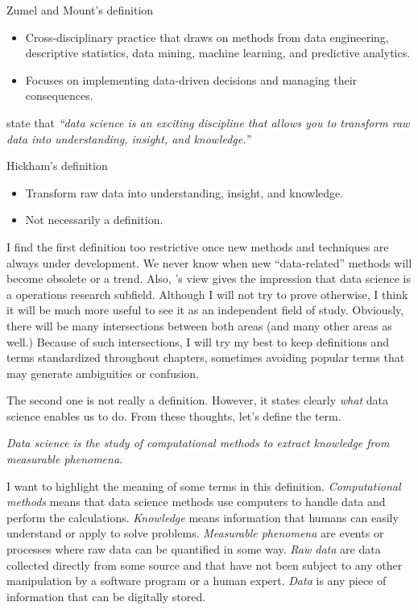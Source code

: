 \begin{mainbox}{Zumel and Mount's definition}
  \begin{itemize}
    \item Cross-disciplinary practice that draws on methods from data
    engineering, descriptive statistics, data mining, machine learning, and predictive
    analytics.
    \item Focuses on implementing data-driven decisions and managing their consequences.
  \end{itemize}
\end{mainbox}

\textcite{Hickham2023} state that \emph{``data science is an exciting discipline that
allows you to transform raw data into understanding, insight, and knowledge.''}

\begin{mainbox}{Hickham's definition}
  \begin{itemize}
    \item Transform raw data into understanding, insight, and knowledge.
    \item Not necessarily a definition.
  \end{itemize}
\end{mainbox}

I find the first definition too restrictive once new methods and techniques are always
under development.  We never know when new ``data-related'' methods will become obsolete
or a trend.  Also, \textcite{Zumel2019}'s view gives the impression that data science is a
operations research subfield.  Although I will not try to prove otherwise, I think it will
be much more useful to see it as an independent field of study.  Obviously, there will be
many intersections between both areas (and many other areas as well.)  Because of such
intersections, I will try my best to keep definitions and
terms standardized throughout chapters, sometimes avoiding popular terms that may generate
ambiguities or confusion.

The second one is not really a definition.  However, it states clearly \emph{what} data
science enables us to do.  From these thoughts, let's define the term.

\begin{displayquote}
  \em
  Data science is the study of computational methods to extract knowledge from
  measurable phenomena.
\end{displayquote}

I want to highlight the meaning of some terms in this definition.  \emph{Computational methods} means
that data science methods use computers to handle data and perform the calculations.
\emph{Knowledge} means information that humans can easily understand or apply to solve
problems.  \emph{Measurable phenomena} are events or processes where raw data can be
quantified in some way.  \emph{Raw data} are data collected directly from some source and
that have not been subject to any other manipulation by a software program or a human
expert.  \emph{Data} is any piece of information that can be digitally stored.

